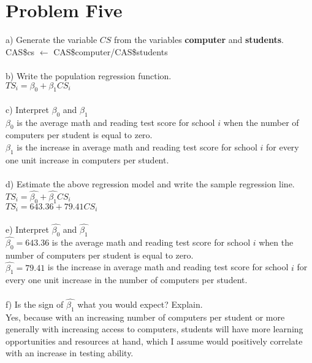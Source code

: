 \documentclass[11pt, oneside]{article}   	%
\begin{document}
\section{Problem Five}
a) Generate the variable $CS$ from the variables \textbf{computer} and \textbf{students}.\\
CAS\$cs $\leftarrow$ CAS\$computer/CAS\$students\\~\\
b) Write the population regression function.\\
$TS_i = \beta_0 + \beta_1CS_i$\\~\\
c) Interpret $\beta_0$ and $\beta_1$\\
$\beta_0$ is the average math and reading test score for school $i$ when the number of computers per student is equal to zero.\\
$\beta_1$ is the increase in average math and reading test score for school $i$ for every one unit increase in computers per student.\\~\\
d) Estimate the above regression model and write the sample regression line.\\
$TS_i = \hat{\beta_0} + \hat{\beta_1}CS_i$\\
$TS_i = 643.36 +  79.41CS_i$\\~\\
e) Interpret $\hat{\beta_0}$ and $\hat{\beta_1}$\\
$\hat{\beta_0} = 643.36$ is the average math and reading test score for school $i$ when the number of computers per student is equal to zero. \\
$\hat{\beta_1} = 79.41$ is the increase in average math and reading test score for school $i$ for every one unit increase in the number of computers per student.\\~\\
f) Is the sign of $\hat{\beta_1}$ what you would expect? Explain.\\
Yes, because with an increasing number of computers per student or more generally with increasing access to computers, students will have more learning opportunities and resources at hand, which I assume would positively correlate with an increase in testing ability.\\
\end{document}
